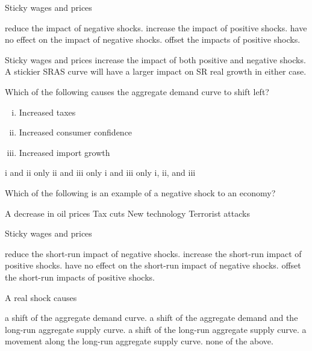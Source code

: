 \documentclass[addpoints,11pt]{exam}
\theoremstyle{definition}
\begin{document}
\begin{questions}
\question Sticky wages and prices 

\begin{choices}
	\choice reduce the impact of negative shocks.
	\CorrectChoice increase the impact of positive shocks.
	\choice have no effect on the impact of negative shocks. 
	\choice offset the impacts of positive shocks.
\end{choices}

\begin{solution}
	Sticky wages and prices increase the impact of both positive and negative shocks. A stickier SRAS curve will have a larger impact on SR real growth in either case.
\end{solution}




\question Which of the following causes the aggregate demand curve to shift left?

\begin{enumerate}[(i)]
	\item Increased taxes
	\item Increased consumer confidence
	\item Increased import growth
\end{enumerate}

\begin{choices}
	\choice i and ii only
	\choice ii and iii only
	\CorrectChoice i and iii only
	\choice i, ii, and iii
\end{choices}



\question Which of the following is an example of a negative shock to an economy?

\begin{choices}
	\choice A decrease in oil prices
	\choice Tax cuts
	\choice New technology
	\CorrectChoice Terrorist attacks
\end{choices}

\newpage

\question Sticky wages and prices

\begin{choices}
	\choice reduce the short-run impact of negative shocks.
	\CorrectChoice increase the short-run impact of positive shocks.
	\choice have no effect on the short-run impact of negative shocks.
	\choice offset the short-run impacts of positive shocks.
\end{choices}

\question A real shock causes 

\begin{choices}
	\choice a shift of the aggregate demand curve.
	\choice a shift of the aggregate demand and the long-run aggregate supply curve.
	\CorrectChoice a shift of the long-run aggregate supply curve.
	\choice a movement along the long-run aggregate supply curve.
	\choice none of the above.
\end{choices}


\end{questions}
\end{document}
